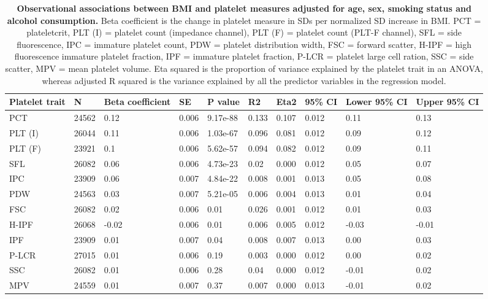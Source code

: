 \documentclass[11pt,twoside]{bristolthesis}
\begin{document}
\begin{landscape}\begin{table}

\caption[Observational associations between BMI and platelet measures adjusted for age, sex, smoking status and alcohol consumption]{\label{tab:BMI-platelets-adjust}\textbf{Observational associations between BMI and platelet measures adjusted for age, sex, smoking status and alcohol consumption.} Beta coefficient is the change in platelet measure in SDs per normalized SD increase in BMI. PCT = plateletcrit, PLT (I) = platelet count (impedance channel), PLT (F) = platelet count (PLT-F channel), SFL = side fluorescence, IPC = immature platelet count, PDW = platelet distribution width, FSC = forward scatter, H-IPF = high fluorescence immature platelet fraction, IPF = immature platelet fraction, P-LCR = platelet large cell ration, SSC = side scatter, MPV = mean platelet volume. Eta squared is the proportion of variance explained by the platelet trait in an ANOVA, whereas adjusted R squared is the variance explained by all the predictor variables in the regression model.}
\centering
\begin{tabu} to 
\toprule
Platelet trait & N & Beta coefficient & SE & P value & R2 & Eta2 & 95\% CI & Lower 95\% CI & Upper 95\% CI\\
\midrule
PCT & 24562 & 0.12 & 0.006 & 9.17e-88 & 0.133 & 0.107 & 0.012 & 0.11 & 0.13\\
PLT (I) & 26044 & 0.11 & 0.006 & 1.03e-67 & 0.096 & 0.081 & 0.012 & 0.09 & 0.12\\
PLT (F) & 23921 & 0.1 & 0.006 & 5.62e-57 & 0.094 & 0.082 & 0.012 & 0.09 & 0.11\\
SFL & 26082 & 0.06 & 0.006 & 4.73e-23 & 0.02 & 0.000 & 0.012 & 0.05 & 0.07\\
IPC & 23909 & 0.06 & 0.007 & 4.84e-22 & 0.008 & 0.001 & 0.013 & 0.05 & 0.08\\
\addlinespace
PDW & 24563 & 0.03 & 0.007 & 5.21e-05 & 0.006 & 0.004 & 0.013 & 0.01 & 0.04\\
FSC & 26082 & 0.02 & 0.006 & 0.01 & 0.026 & 0.001 & 0.012 & 0.01 & 0.03\\
H-IPF & 26068 & -0.02 & 0.006 & 0.01 & 0.006 & 0.005 & 0.012 & -0.03 & -0.01\\
IPF & 23909 & 0.01 & 0.007 & 0.04 & 0.008 & 0.007 & 0.013 & 0.00 & 0.03\\
P-LCR & 27015 & 0.01 & 0.006 & 0.19 & 0.003 & 0.000 & 0.012 & 0.00 & 0.02\\
\addlinespace
SSC & 26082 & 0.01 & 0.006 & 0.28 & 0.04 & 0.000 & 0.012 & -0.01 & 0.02\\
MPV & 24559 & 0.01 & 0.007 & 0.37 & 0.007 & 0.000 & 0.013 & -0.01 & 0.02\\
\bottomrule
\end{tabu}
\end{table}
\end{landscape}
\end{document}
